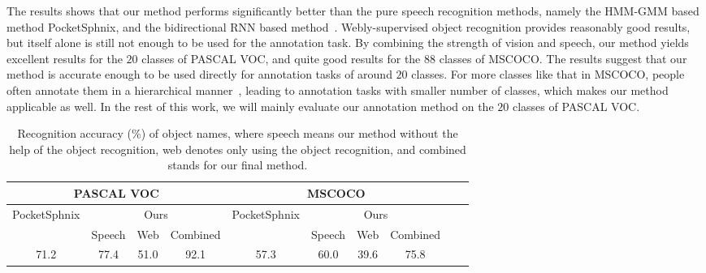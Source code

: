 The results shows that our method performs significantly better than
the pure speech recognition methods, namely the HMM-GMM based method
PocketSphnix, and the bidirectional RNN based
method~\citep{end-to-end:speech,lexfree2015}. Webly-supervised object
recognition provides reasonably good results, but itself alone is
still not enough to be used for the annotation task. By combining the
strength of vision and speech, our method yields excellent results for
the $20$ classes of PASCAL VOC, and quite good results for the $88$
classes of MSCOCO. The results suggest that our method is accurate
enough to be used directly for annotation tasks of around $20$
classes. For more classes like that in MSCOCO, people often annotate
them in a hierarchical manner~\citep{coco:eccv}, leading to annotation
tasks with smaller number of classes, which makes our method
applicable as well.  In the rest of this work, we will mainly evaluate
our annotation method on the $20$ classes of PASCAL VOC.

\begin{table}[tb]
  \centering
  \setlength\tabcolsep{1mm}
\begin{tabular}{|c|c|c|c|c|c|c|c|c|c|  }
 \hline
 \multicolumn{4}{|c|}{PASCAL VOC} &  \multicolumn{4}{c|}{MSCOCO} \\
 \hline
 \multirow{2}{*}{PocketSphnix} &  \multicolumn{3}{c|}{Ours} &  \multirow{2}{*}{PocketSphnix} &  \multicolumn{3}{c|}{Ours} \\ 
 \cline{2-4}    \cline{6-8} 
        &   Speech  & Web &  Combined  &   &   Speech  & Web &  Combined  \\                 
 \hline
   71.2 &  77.4   & 51.0 & 92.1 & 57.3 & 60.0 & 39.6 & 75.8\\
 \hline
\end{tabular}        
\caption{Recognition accuracy (\%) of object names, where speech means our method without the help of the object recognition, web denotes only using the object recognition, and combined stands for our final method.}
 \label{table:class:eval}  
\end{table}

